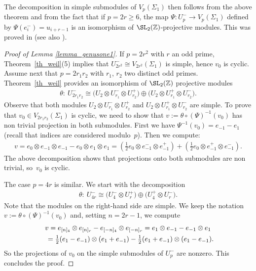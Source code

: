 The decomposition in simple submodules of $V_p(\Sigma_1)$ then follows from the above theorem and from the fact that if $p=2r\geq 6$, the map $\Psi\colon U_p^- \rightarrow V_{p}(\Sigma_1)$
defined by $\Psi(e_i^-) = u_{i+r-1}$ is an isomorphism of $\SL_2(\mathbb{Z})$-projective modules. This was proved in \cite{FK} (see also \cite[Theorem~5.1]{Koju1}).

\begin{proof}[Proof of Lemma \ref{lemma_genusone1}]If $p=2r^2$ with $r$ an odd prime, Theorem~\ref{th_weil}(5) implies that $U_{2 r^2}^- \cong V_{2r^2}(\Sigma_1)$ is simple, hence $v_0$ is cyclic. Assume next that $p=2r_1r_2$ with $r_1$, $r_2$ two distinct odd primes. Theorem~\ref{th_weil} provides an isomorphism of $\SL_2(\mathbb{Z})$ projective modules
\begin{gather*} \theta \colon \ U_{2r_1r_2}^- \cong \big(U_2\otimes U_{r_1}^-\otimes U_{r_2}^+\big) \oplus \big(U_2\otimes U_{r_1}^+ \otimes U_{r_2}^-\big).\end{gather*}
Observe that both modules $U_2\otimes U_{r_1}^-\otimes U_{r_2}^+$ and $U_2\otimes U_{r_1}^+ \otimes U_{r_2}^-$ are simple. To prove that $v_0 \in V_{2r_1r_2}(\Sigma_1)$ is cyclic, we need to show that $v:= \theta\circ (\Psi)^{-1} (v_0) $ has non trivial projection in both submodules. First we have $\Psi^{-1}(v_0) = e_{-1} - e_1$ (recall that indices are considered modulo~$p$). Then we compute:
\begin{gather*} v = e_0\otimes e_{-1} \otimes e_{-1} - e_0\otimes e_1\otimes e_1 = \left( \tfrac{1}{2} e_0 \otimes e_{-1}^- \otimes e_{-1}^+ \right) + \left(\tfrac{1}{2} e_0\otimes e_{-1}^+\otimes e_{-1}^- \right).\end{gather*}
The above decomposition shows that projections onto both submodules are non trivial, so~$v_0$ is cyclic.

The case $p=4r$ is similar. We start with the decomposition
\begin{gather*} \theta \colon \ U_{4r}^- \cong \big(U_4^- \otimes U_r^+\big) \oplus \big(U_4^+ \otimes U_r^-\big).\end{gather*}
Note that the modules on the right-hand side are simple. We keep the notation $v:=\theta\circ (\Psi)^{-1}(v_0)$ and, setting $n=2r-1$, we compute
\begin{gather*} v= e_{[n]_4}\otimes e_{[n]_r} - e_{[-n]_4}\otimes e_{[-n]_r} = e_1\otimes e_{-1} - e_{-1}\otimes e_1 \\
\hphantom{v}{} = \tfrac{1}{2}(e_1-e_{-1})\otimes (e_1+e_{-1}) - \tfrac{1}{2}(e_1+e_{-1})\otimes (e_1-e_{-1}).
\end{gather*}
So the projections of $v_0$ on the simple submodules of $U_p^-$ are nonzero. This concludes the proof.
\end{proof}

